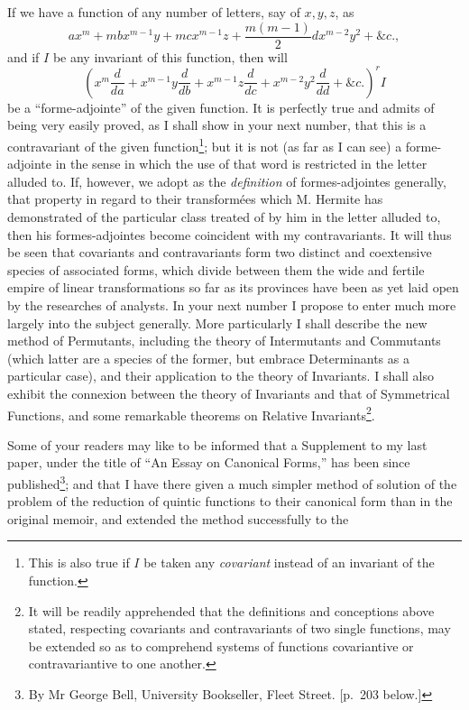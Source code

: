 \documentclass[11pt]{article}
\begin{document}
{{If we have a function of any number of letters, say of $x,y,z$, as
\[
 ax^m+mbx^{m-1}y+mcx^{m-1}z+\frac{m(m-1)}{2}dx^{m-2}y^2+\&c.,
\]
and if $I$ be any invariant of this function, then will
\[
 \left(
 x^m\frac{d}{da}+x^{m-1}y\frac{d}{db}
 +x^{m-1}z\frac{d}{dc}
 +x^{m-2}y^2\frac{d}{dd}+\&c.
 \right)^r I
\]
be a ``forme-adjointe'' of the given function. It is perfectly true and admits of being very easily proved, as I shall show in your next number, that this is a contravariant of the given function\footnote{This is also true if $I$ be taken any \emph{covariant} instead of an invariant of the function.}; but it is not (as far as I can see) a forme-adjointe in the sense in which the use of that word is restricted in the letter alluded to. If, however, we adopt as the \emph{definition} of formes-adjointes generally, that property in regard to their transform\'ees which M. Hermite has demonstrated of the particular class treated of by him in the letter alluded to, then his formes-adjointes become coincident with my contravariants. It will thus be seen that covariants and contravariants form two distinct and coextensive species of associated forms, which divide between them the wide and fertile empire of linear transformations so far as its provinces have been as yet laid open by the researches of analysts. In your next number I propose to enter much more largely into the subject generally. More particularly I shall describe the new method of Permutants, including the theory of Intermutants and Commutants (which latter are a species of the former, but embrace Determinants as a particular case), and their application to the theory of Invariants. I shall also exhibit the connexion between the theory of Invariants and that of Symmetrical Functions, and some remarkable theorems on Relative Invariants\footnote{It will be readily apprehended that the definitions and conceptions above stated, respecting covariants and contravariants of two single functions, may be extended so as to comprehend systems of functions covariantive or contravariantive to one another.}.

Some of your readers may like to be informed that a Supplement to my last paper, under the title of ``An Essay on Canonical Forms,'' has been since published\footnote{By Mr George Bell, University Bookseller, Fleet Street. [p.~203 below.]}; and that I have there given a much simpler method of solution of the problem of the reduction of quintic functions to their canonical form than in the original memoir, and extended the method successfully to the

}}
\end{document}
